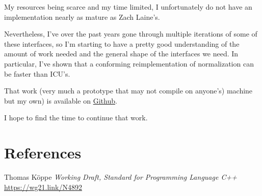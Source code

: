 \documentclass{wg21}
\begin{document}
My resources being scarce and my time limited, I unfortunately
do not have an implementation nearly as mature as Zach Laine's.

Nevertheless, I've over the past years gone through multiple iterations of some of these interfaces, so I'm starting to have a pretty good understanding of the amount of work needed and the general shape of the interfaces we need.
In particular, I've shown that a conforming reimplementation of normalization can be
faster than ICU's.

That work (very much a prototype that may not compile on anyone's)
machine but my own) is available on \href{https://github.com/cor3ntin/ext-Unicode-db/tree/cpp_gen}{Github}.

I hope to find the time to continue that work.

\section{References}

\renewcommand{\section}[2]{}%



\begin{thebibliography}{9}

Thomas Köppe
\emph{Working Draft, Standard for Programming Language C++}\newline
\url{https://wg21.link/N4892}

\end{thebibliography}
\end{document}

